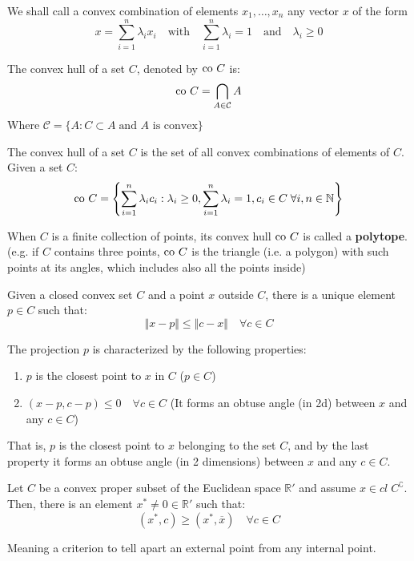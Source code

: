\documentclass[../main.tex]{subfiles}
\begin{document}
\begin{definition}
    We shall call a convex combination of elements $x_1 , \ldots, x_n$ any vector $x$ of the form
    \[
        x = \sum_{i=1}^{n} \lambda_i x_i \quad \text{with} \quad \sum_{i=1}^{n} \lambda_i = 1 \quad \text{and} \quad \lambda_i \geq 0
    \]
\end{definition}
\newpage %
\begin{definition}
    The convex hull of a set $C$, denoted by $\operatorname{co\,} C$ is:
    \[
        \operatorname{co\,} C = \bigcap _{A \in \mathcal{C}} A
    \]
    Where $\mathcal{C} = \{A: C \subset A \; \text{and $A$ is convex}\}$
\end{definition}

\begin{proposition}
    The convex hull of a set $C$ is the set of all convex combinations of elements of $C$. Given a set $C$:
    \[
        \operatorname{co\,} C = \left\{ \sum_{i=1}^n \lambda_i c_i :  \lambda_i \geq 0, \sum_{i=1}^n \lambda_i = 1, c_i \in C \; \forall i, n \in \mathbb{N} \right\}
    \]
\end{proposition}

When $C$ is a finite collection of points, its convex hull $\operatorname{co\,} C$ is called a \textbf{polytope}. (e.g. if $C$ contains three points, $\operatorname{co\,} C$ is the triangle (i.e. a polygon) with such points at its angles, which includes also all the points inside)

\begin{theorem}
    Given a closed convex set $C$ and a point $x$ outside $C$, there is a unique element $p \in C$ such that:
    \[
        \Vert x - p \Vert \leq \Vert c - x \Vert \quad \forall c \in C
    \]
\end{theorem}
The projection $p$ is characterized by the following properties:
\begin{enumerate}[label=(\roman*)]
    \item $p$ is the closest point to $x$ in $C$ ($p \in C$)
    \item $(x-p,c-p) \leq 0 \quad \forall c \in C$ (It forms an obtuse angle (in 2d) between $x$ and any $c \in C$)
\end{enumerate}

That is, $p$ is the closest point to $x$ belonging to the set $C$, and by the last property it forms an obtuse angle (in 2 dimensions) between $x$ and any $c\in C$.

\begin{theorem}
    Let $C$ be a convex proper subset of the Euclidean space $\mathbb{R}'$ and assume $x \in cl \; C^\complement$. Then, there is an element $x^* \neq 0 \in \mathbb{R}'$ such that:
    \[
        (x^*, c)  \geq (x^*, \overline{x}) \quad \forall c \in C
    \]
\end{theorem}
Meaning a criterion to tell apart an external point from any internal point.
\end{document}
